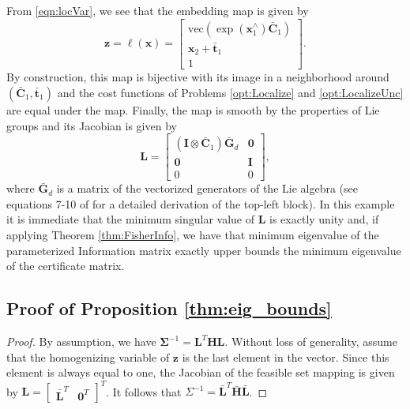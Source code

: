\documentclass[lettersize,journal]{IEEEtran}
\newcommand{\vect}[1]{\mbox{vec}(#1)}
\begin{document}
{From \eqref{eqn:locVar}, we see that the embedding map is given by
\begin{equation}
	\bm{z}=\bm{\ell}(\bm{x}) = \begin{bmatrix}
		\vect{\exp(\bm{x}_1^\wedge)\bar{\bm{C}}_1}\\ \bm{x}_2 + \bar{\bm{t}}_1 \\ 1
	\end{bmatrix}.
\end{equation}
By construction, this map is bijective with its image in a neighborhood around $(\bar{\bm{C}}_1, \bar{\bm{t}}_1)$ and the cost functions of Problems \ref{opt:Localize} and \ref{opt:LocalizeUnc} are equal under the map. Finally, the map is smooth by the properties of Lie groups and its Jacobian is given by
\begin{equation}
	\bm{L} = \begin{bmatrix}
		(\bm{I}\otimes\bar{\bm{C}}_1) \bar{\bm{G}}_d & \bm{0}\\
		\bm{0} & \bm{I}\\
		0 & 0
	\end{bmatrix},
\end{equation}
where $\bar{\bm{G}}_d$ is a matrix of the vectorized generators of the Lie algebra (see equations 7-10 of \cite{dellaertShonanRotationAveraging2020} for a detailed derivation of the top-left block). In this example it is immediate that the minimum singular value of $\bm{L}$ is exactly unity and, if applying Theorem \ref{thm:FisherInfo}, we have that minimum eigenvalue of the parameterized Information matrix exactly upper bounds the minimum eigenvalue of the certificate matrix.

\subsection{Proof of Proposition \ref{thm:eig_bounds}}\label{SM:lemma2Proof}

\begin{proof}
By assumption, we have $\bm{\Sigma}^{-1} = \bm{L}^T\bm{H}\bm{L}$. Without loss of generality, assume that the homogenizing variable of $\bm{z}$ is the last element in the vector. Since this element is always equal to one, the Jacobian of the feasible set mapping is given by $\bm{L} = \begin{bmatrix}
	\bar{\bm{L}}^T & \bm{0}^T
\end{bmatrix}^T$. It follows that ${\Sigma}^{-1} = \bar{\bm{L}}^T\bar{\bm{H}}\bar{\bm{L}}$.


\end{proof}}
\end{document}
